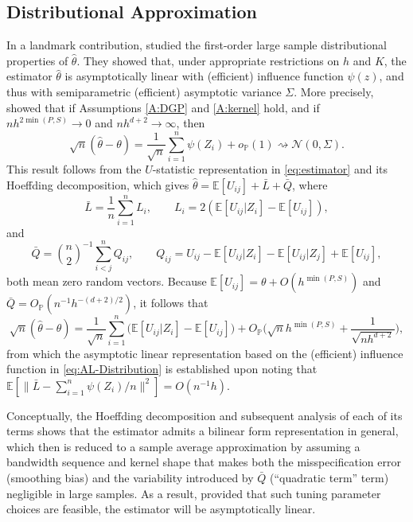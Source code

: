 \documentclass[11pt]{article}
\numberwithin{equation}{section}
\theoremstyle{definition}
\renewcommand{\P}{\mathbb{P}}
\newcommand{\E}{\mathbb{E}}
\begin{document}
\subsection{Distributional Approximation}

In a landmark contribution, \citet{Powell-Stock-Stoker_1989_ECMA} studied the first-order large sample distributional properties of $\widehat{\theta}$. They showed that, under appropriate restrictions on $h$ and $K$, the estimator $\widehat{\theta}$ is asymptotically linear with (efficient) influence function $\psi(z)$, and thus with semiparametric (efficient) asymptotic variance $\Sigma$. More precisely, \citet{Powell-Stock-Stoker_1989_ECMA} showed that if Assumptions \ref{A:DGP} and \ref{A:kernel} hold,
and if $nh^{2\min(P,S)}\to 0$ and $nh^{d+2}\to \infty $, then
\begin{equation}\label{eq:AL-Distribution}
    \sqrt{n}(\widehat{\theta} - \theta) = \frac{1}{\sqrt{n}} \sum_{i=1}^{n} \psi(Z_i) + o_\P(1)
    \rightsquigarrow \mathcal{N}(0, \Sigma).
\end{equation}
This result follows from the $U$-statistic representation in \eqref{eq:estimator} and its Hoeffding decomposition, which gives $\widehat{\theta} = \E[U_{ij}] + \bar{L} + \bar{Q}$, where
\[\bar{L} = \frac{1}{n}\sum_{i=1}^{n} L_i, \qquad L_i = 2(\E[U_{ij}|Z_i] - \E[U_{ij}]),\]
and
\[\bar{Q} = \binom{n}{2}^{-1}\sum_{i<j}^n Q_{ij}, \qquad Q_{ij} = U_{ij} - \E[U_{ij}|Z_i] - \E[U_{ij}|Z_j] + \E[U_{ij}],\]
both mean zero random vectors. Because $\E[U_{ij}] = \theta + O(h^{\min(P,S)})$ and $\bar{Q} = O_\P(n^{-1}h^{-(d+2)/2})$, it follows that
\[\sqrt{n}(\widehat{\theta} - \theta) = \frac{1}{\sqrt{n}}\sum_{i=1}^{n} \Big( \E[U_{ij}|Z_i] - \E[U_{ij}]\Big) + O_\P\Big(\sqrt{n}h^{\min(P,S)} + \frac{1}{\sqrt{n h^{d+2}}}\Big),
\]
from which the asymptotic linear representation based on the (efficient) influence function in \eqref{eq:AL-Distribution} is established upon noting that $\E[\|\bar{L}- \sum_{i=1}^{n} \psi(Z_i)/n\|^2]=O(n^{-1}h)$.

Conceptually, the Hoeffding decomposition and subsequent analysis of each of its terms shows that the estimator admits a bilinear form representation in general, which then is reduced to a sample average approximation by assuming a bandwidth sequence and kernel shape that makes both the misspecification error (smoothing bias) and the variability introduced by $\bar{Q}$ (``quadratic term'' term) negligible in large samples. As a result, provided that such tuning parameter choices are feasible, the estimator will be asymptotically linear.
\end{document}
